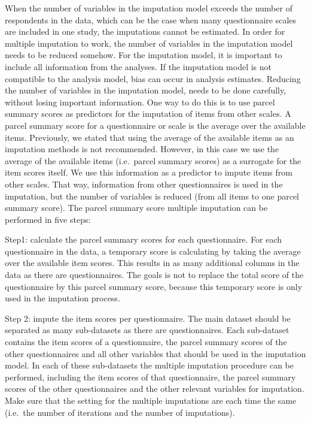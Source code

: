 \documentclass[
]{book}
\begin{document}
When the number of variables in the imputation model exceeds the number of respondents in the data, which can be the case when many questionnaire scales are included in one study, the imputations cannot be estimated. In order for multiple imputation to work, the number of variables in the imputation model needs to be reduced somehow. For the imputation model, it is important to include all information from the analyses. If the imputation model is not compatible to the analysis model, bias can occur in analysis estimates. Reducing the number of variables in the imputation model, needs to be done carefully, without losing important information. One way to do this is to use parcel summary scores as predictors for the imputation of items from other scales. A parcel summary score for a questionnaire or scale is the average over the available items. Previously, we stated that using the average of the available items as an imputation methods is not recommended. However, in this case we use the average of the available items (i.e.~parcel summary scores) as a surrogate for the item scores itself. We use this information as a predictor to impute items from other scales. That way, information from other questionnaires is used in the imputation, but the number of variables is reduced (from all items to one parcel summary score). The parcel summary score multiple imputation can be performed in five steps:

Step1: calculate the parcel summary scores for each questionnaire. For each questionnaire in the data, a temporary score is calculating by taking the average over the available item scores. This results in as many additional columns in the data as there are questionnaires. The goals is not to replace the total score of the questionnaire by this parcel summary score, because this temporary score is only used in the imputation process.

Step 2: impute the item scores per questionnaire. The main dataset should be separated as many sub-datasets as there are questionnaires. Each sub-dataset contains the item scores of a questionnaire, the parcel summary scores of the other questionnaires and all other variables that should be used in the imputation model. In each of these sub-datasets the multiple imputation procedure can be performed, including the item scores of that questionnaire, the parcel summary scores of the other questionnaires and the other relevant variables for imputation. Make sure that the setting for the multiple imputations are each time the same (i.e.~the number of iterations and the number of imputations).
\end{document}
